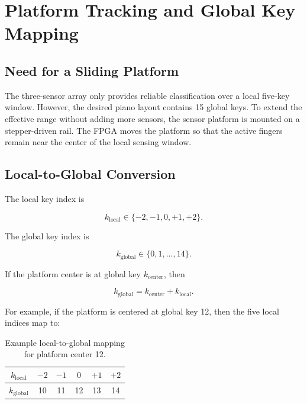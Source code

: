 \section{Platform Tracking and Global Key Mapping}
\label{sec:platform_tracking}

\subsection{Need for a Sliding Platform}

The three-sensor array only provides reliable classification over a local five-key window. However, the desired piano layout contains 15 global keys. To extend the effective range without adding more sensors, the sensor platform is mounted on a stepper-driven rail. The FPGA moves the platform so that the active fingers remain near the center of the local sensing window.

\subsection{Local-to-Global Conversion}

The local key index is

\begin{equation}
    k_{\mathrm{local}} \in \{-2,-1,0,+1,+2\}.
\end{equation}

The global key index is

\begin{equation}
    k_{\mathrm{global}} \in \{0,1,\ldots,14\}.
\end{equation}

If the platform center is at global key $k_{\mathrm{center}}$, then

\begin{equation}
    k_{\mathrm{global}} = k_{\mathrm{center}} + k_{\mathrm{local}}.
\end{equation}

For example, if the platform is centered at global key 12, then the five local indices map to:

\begin{table}[H]
    \centering
    \caption{Example local-to-global mapping for platform center 12.}
    \label{tab:local_global_example}
    \renewcommand{\arraystretch}{1.2}
    \begin{tabular}{c c c c c c}
        \toprule
        $k_{\mathrm{local}}$ & $-2$ & $-1$ & $0$ & $+1$ & $+2$ \\
        \midrule
        $k_{\mathrm{global}}$ & 10 & 11 & 12 & 13 & 14 \\
        \bottomrule
    \end{tabular}
\end{table}

